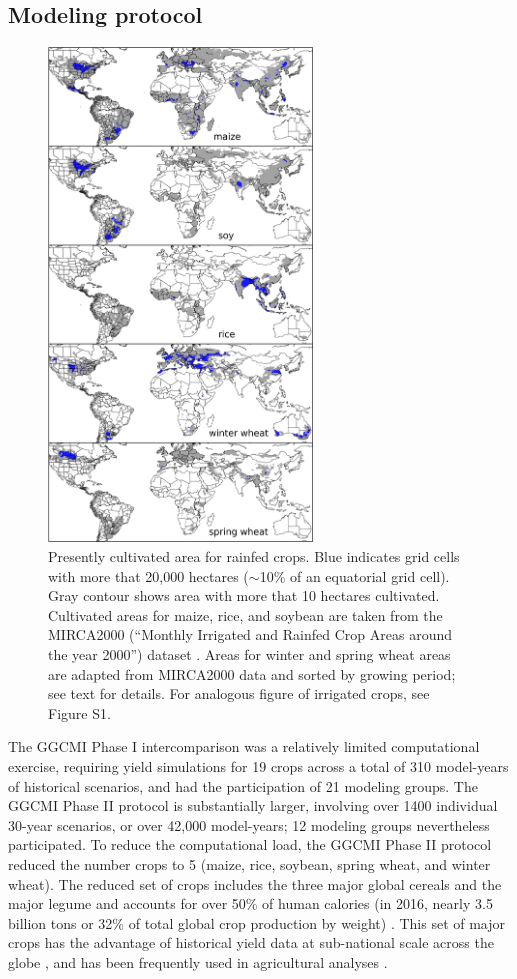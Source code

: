 \documentclass[gmd, manuscript]{copernicus} %
\begin{document}
\subsection{Modeling protocol}
\begin{figure}[ht]
\centering
   \includegraphics[width=7cm]{figures/croparea.png}
   \caption{Presently cultivated area for rainfed crops. Blue indicates grid cells with more that 20,000 hectares ($\sim$10\% of an equatorial grid cell). 
   Gray contour shows area with more that 10 hectares cultivated. Cultivated areas for maize, rice, and soybean are taken from the MIRCA2000 (``Monthly Irrigated and Rainfed Crop Areas around the year 2000'') dataset \citep{Portmann2010}. 
   Areas for winter and spring wheat areas are adapted from MIRCA2000 data and sorted by growing period; see text for details.  For analogous figure of irrigated crops, see Figure S1.}
   \label{fig:crop_area}
\end{figure}

The GGCMI Phase I intercomparison was a relatively limited computational exercise, requiring yield simulations for 19 crops across a total of 310 model-years of historical scenarios, and had the participation of 21 modeling groups.
The GGCMI Phase II protocol is substantially larger, involving over 1400 individual 30-year scenarios, or over 42,000 model-years; 12 modeling groups nevertheless participated. To reduce the computational load, the GGCMI Phase II protocol reduced the number crops to 5 (maize, rice, soybean, spring wheat, and winter wheat). 
The reduced set of crops includes the three major global cereals and the major legume and accounts for over 50\% of human calories (in 2016, nearly 3.5 billion tons or 32\% of total global crop production by weight) \citep{FAOSTAT}. This set of major crops has the advantage of  historical yield data at sub-national scale across the globe \citep{Ray2012,iizumi_historical_2014}, and has been frequently used in agricultural analyses \citep[e.g.][]{muller_global_2017,porwollik_spatial_2016}.  %
\end{document}
